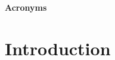 \tableofcontents
\listoftables
\listoffigures

\newpage
\begin{center}
\textbf{Acronyms}
\end{center}


\chapter{Introduction}